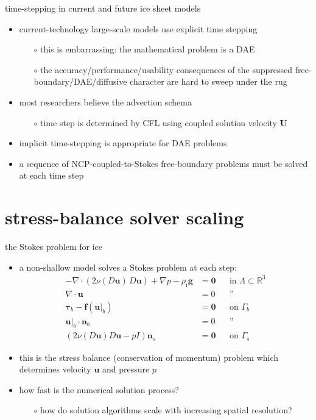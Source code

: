 \documentclass[svgnames,
               hyperref={colorlinks,citecolor=DeepPink4,linkcolor=FireBrick,urlcolor=Maroon},
               usepdftitle=false]  %
               {beamer}
\newcommand{\RR}{\mathbb{R}}
\newcommand{\bbf}{\mathbf{f}}
\newcommand{\bn}{\mathbf{n}}
\newcommand{\bu}{\mathbf{u}}
\newcommand{\bU}{\mathbf{U}}
\newcommand{\btau}{\bm{\tau}}
\newcommand{\bzero}{\bm{0}}
\newcommand{\rhoi}{\rho_{\text{i}}}
\begin{document}
\begin{frame}{time-stepping in current and future ice sheet models}

\begin{itemize}
\item current-technology large-scale models use explicit time stepping
    \begin{itemize}
    \item[$\circ$] this is embarrassing: the mathematical problem is a DAE
    \item[$\circ$] the accuracy/performance/usability consequences of the suppressed free-boundary/DAE/diffusive character are hard to sweep under the rug
    \end{itemize}
\item most researchers believe the advection schema
    \begin{itemize}
    \item[$\circ$] time step is determined by CFL using coupled solution velocity $\bU$
    \end{itemize}

\medskip
\item \alert{implicit time-stepping} is appropriate for DAE problems
\item a sequence of NCP-coupled-to-Stokes free-boundary problems must be solved at each time step
\end{itemize}
\end{frame}


\section{stress-balance solver scaling}

\begin{frame}{the Stokes problem for ice}

\begin{itemize}
\item a non-shallow model solves a Stokes problem at each step:
\begin{align*}
- \nabla \cdot \left(2 \nu(D\bu)\, D\bu\right) + \nabla p - \rhoi \mathbf{g} &= \bzero && \text{in $\Lambda \subset \RR^3$} \\
\nabla \cdot \bu &= 0 && \text{''} \\
\btau_b - \bbf(\bu|_b) &= \bzero && \text{on $\Gamma_b$} \\
\bu|_b \cdot \bn_b &= 0 && \text{''} \\
\left(2 \nu(D\bu) D\bu - pI\right) \bn_s &= \bzero && \text{on $\Gamma_s$}
\end{align*}
\item this is the \alert{stress balance} (conservation of momentum) problem which determines velocity $\bu$ and pressure $p$
\item how fast is the numerical solution process?
    \begin{itemize}
    \item[$\circ$] how do solution algorithms \alert{scale} with increasing spatial resolution?
    \end{itemize}
\end{itemize}
\end{frame}
\end{document}
